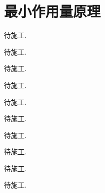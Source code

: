 \chapter{最小作用量原理}

\problem{}
\begin{solution}
    待施工.
\end{solution}

\problem{}
\begin{solution}
    待施工.
\end{solution}


\problem{}
\begin{solution}
    待施工.
\end{solution}


\problem{}
\begin{solution}
    待施工.
\end{solution}


\problem{}
\begin{solution}
    待施工.
\end{solution}


\problem{}
\begin{solution}
    待施工.
\end{solution}


\problem{}
\begin{solution}
    待施工.
\end{solution}


\problem{}
\begin{solution}
    待施工.
\end{solution}



\problem{}
\begin{solution}
    待施工.
\end{solution}



\problem{}
\begin{solution}
    待施工.
\end{solution}



